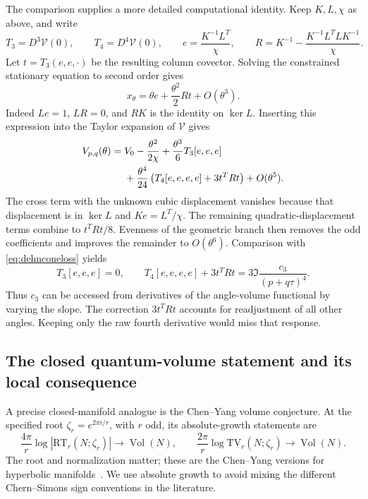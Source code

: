 \documentclass[11pt,a4paper]{article}
\numberwithin{equation}{section}
\theoremstyle{definition}
\theoremstyle{remark}
\DeclareMathOperator{\Vol}{Vol}
\begin{document}
The comparison supplies a more detailed computational identity.
Keep $K,L,\chi$ as above, and write
\[
 T_3=D^3\mathscr V(0),\qquad T_4=D^4\mathscr V(0),\qquad
 e=\frac{K^{-1}L^T}{\chi},\qquad
 R=K^{-1}-\frac{K^{-1}L^TLK^{-1}}{\chi}.
\]
Let $t=T_3(e,e,\cdot)$ be the resulting column covector. Solving
the constrained stationary equation to second order gives
\[
 x_\theta=\theta e+\frac{\theta^2}{2}Rt+O(\theta^3).
\]
Indeed $Le=1$, $LR=0$, and $RK$ is the identity on
$\ker L$. Inserting this expression into the Taylor expansion of
$\mathscr V$ gives
\begin{align}
 V_{p,q}(\theta)={}&V_0-\frac{\theta^2}{2\chi}
  +\frac{\theta^3}{6}T_3[e,e,e]\notag\\
  &+\frac{\theta^4}{24}
       \left(T_4[e,e,e,e]+3t^TRt\right)+O(\theta^5).
 \label{eq:dehnquartictensors}
\end{align}
The cross term with the unknown cubic displacement vanishes because
that displacement is in $\ker L$ and $Ke=L^T/\chi$.
The remaining quadratic-displacement terms combine to $t^TRt/8$.
Evenness of the geometric branch then removes the odd coefficients
and improves the remainder to $O(\theta^6)$. Comparison with
\eqref{eq:dehnconeloss} yields
\begin{equation}
 \boxed{T_3[e,e,e]=0,\qquad
 T_4[e,e,e,e]+3t^TRt
      =3\Im\frac{c_3}{(p+q\tau)^4}.}
 \label{eq:dehnquarticdictionary}
\end{equation}
Thus $c_3$ can be accessed from derivatives of the angle-volume
functional by varying the slope. The correction $3t^TRt$ accounts
for readjustment of all other angles. Keeping only the raw fourth
derivative would miss that response.

\subsection{The closed quantum-volume statement and its local consequence}

A precise closed-manifold analogue is the Chen--Yang volume conjecture.
At the specified root $\zeta_r=e^{2\pi i/r}$, with $r$ odd, its
absolute-growth statements are
\begin{equation}
 \frac{4\pi}{r}\log|\mathrm{RT}_r(N;\zeta_r)|\longrightarrow\Vol(N),
 \qquad
 \frac{2\pi}{r}\log\mathrm{TV}_r(N;\zeta_r)\longrightarrow\Vol(N).
 \label{eq:closedquantumvolume}
\end{equation}
The root and normalization matter; these are the Chen--Yang versions
for hyperbolic manifolds~\cite{ChenYang}. We use absolute growth
to avoid mixing the different Chern--Simons sign conventions in
the literature.
\end{document}

